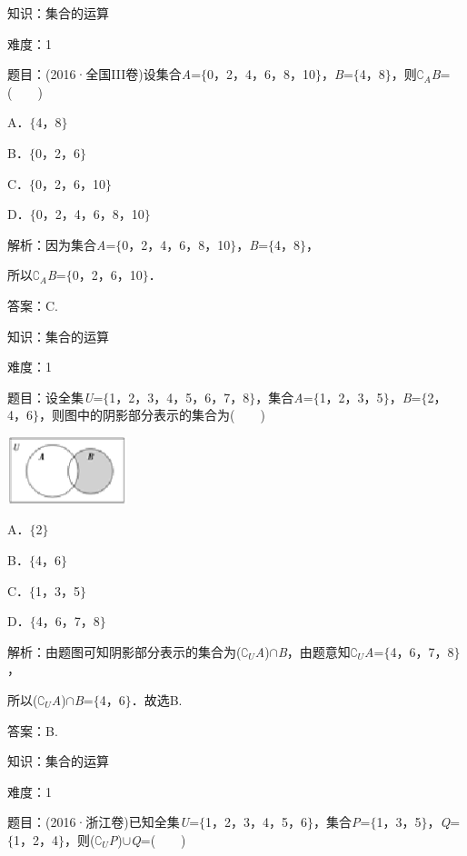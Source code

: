 \documentclass{article} %
\begin{document}
知识：集合的运算

难度：1

题目：(2016·全国III卷)设集合\textit{A}=$\mathrm{\{}$0，2，4，6，8，10$\mathrm{\}}$，\textit{B}=$\mathrm{\{}$4，8$\mathrm{\}}$，则$\mathrm{\complement}$\textit{${}_{A}$B}=(　　)

A．$\mathrm{\{}$4，8$\mathrm{\}}$　　　　　　 

B．$\mathrm{\{}$0，2，6$\mathrm{\}}$

C．$\mathrm{\{}$0，2，6，10$\mathrm{\}}$   

D．$\mathrm{\{}$0，2，4，6，8，10$\mathrm{\}}$

解析：因为集合\textit{A}=$\mathrm{\{}$0，2，4，6，8，10$\mathrm{\}}$，\textit{B}=$\mathrm{\{}$4，8$\mathrm{\}}$，

所以$\mathrm{\complement}$\textit{${}_{A}$B}=$\mathrm{\{}$0，2，6，10$\mathrm{\}}$．

答案：C.

知识：集合的运算

难度：1

题目：设全集\textit{U}=$\mathrm{\{}$1，2，3，4，5，6，7，8$\mathrm{\}}$，集合\textit{A}=$\mathrm{\{}$1，2，3，5$\mathrm{\}}$，\textit{B}=$\mathrm{\{}$2，4，6$\mathrm{\}}$，则图中的阴影部分表示的集合为(　　)

\includegraphics*[width=1.39in, height=0.77in, keepaspectratio=false]{image14}

A．$\mathrm{\{}$2$\mathrm{\}}$   

B．$\mathrm{\{}$4，6$\mathrm{\}}$

C．$\mathrm{\{}$1，3，5$\mathrm{\}}$   

D．$\mathrm{\{}$4，6，7，8$\mathrm{\}}$

解析：由题图可知阴影部分表示的集合为($\mathrm{\complement}$\textit{${}_{U}$A})$\mathrm{\cap}$\textit{B}，由题意知$\mathrm{\complement}$\textit{${}_{U}$A}=$\mathrm{\{}$4，6，7，8$\mathrm{\}}$，

所以($\mathrm{\complement}$\textit{${}_{U}$A})$\mathrm{\cap}$\textit{B}=$\mathrm{\{}$4，6$\mathrm{\}}$．故选B.

答案：B.

知识：集合的运算

难度：1

题目：(2016·浙江卷)已知全集\textit{U}=$\mathrm{\{}$1，2，3，4，5，6$\mathrm{\}}$，集合\textit{P}=$\mathrm{\{}$1，3，5$\mathrm{\}}$，\textit{Q}=$\mathrm{\{}$1，2，4$\mathrm{\}}$，则($\mathrm{\complement}$\textit{${}_{U}$P})$\mathrm{\cup}$\textit{Q}=(　　)
\end{document}
